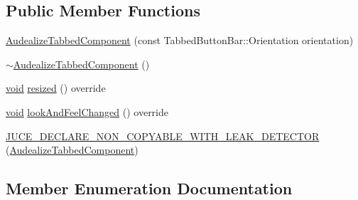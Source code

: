 \subsection*{Public Member Functions}
\begin{DoxyCompactItemize}
\item 
\hyperlink{class_audealize_1_1_audealize_tabbed_component_afb946c219ed21ef8e2878649023b0b45}{Audealize\+Tabbed\+Component} (const Tabbed\+Button\+Bar\+::\+Orientation orientation)
\item 
\hyperlink{class_audealize_1_1_audealize_tabbed_component_afbef708d0c2657fb343766020a765478}{$\sim$\+Audealize\+Tabbed\+Component} ()
\item 
\hyperlink{tk_8h_aba408b7cd755a96426e004c015f5de8e}{void} \hyperlink{class_audealize_1_1_audealize_tabbed_component_a43df12a792bbf2cc294a95b1ead79f44}{resized} () override
\item 
\hyperlink{tk_8h_aba408b7cd755a96426e004c015f5de8e}{void} \hyperlink{class_audealize_1_1_audealize_tabbed_component_ae4250795a18e9f1f20b440c8a52bc3e5}{look\+And\+Feel\+Changed} () override
\item 
\hyperlink{class_audealize_1_1_audealize_tabbed_component_aa732f48f26a303ec7f9e1188852bca6d}{J\+U\+C\+E\+\_\+\+D\+E\+C\+L\+A\+R\+E\+\_\+\+N\+O\+N\+\_\+\+C\+O\+P\+Y\+A\+B\+L\+E\+\_\+\+W\+I\+T\+H\+\_\+\+L\+E\+A\+K\+\_\+\+D\+E\+T\+E\+C\+T\+OR} (\hyperlink{class_audealize_1_1_audealize_tabbed_component}{Audealize\+Tabbed\+Component})
\end{DoxyCompactItemize}


\subsection{Member Enumeration Documentation}
